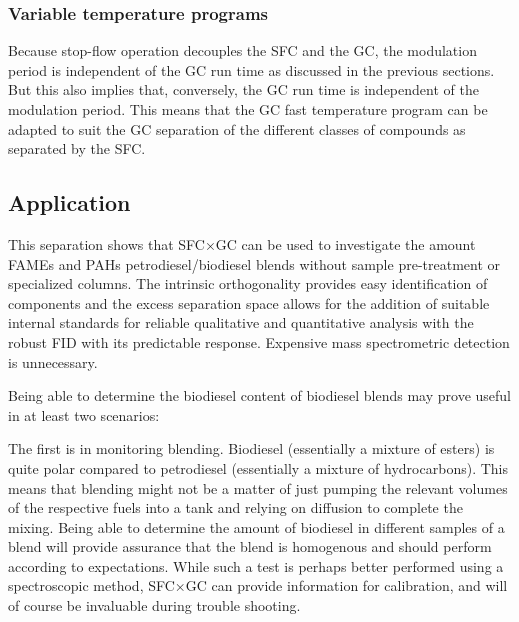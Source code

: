 \subsubsection{Variable temperature programs}

Because stop-flow operation decouples the SFC and the GC, the modulation period
is independent of the GC run time as discussed in the previous sections. But
this also implies that, conversely,  the GC run time is independent of the
modulation period. This means that the GC fast temperature program can be
adapted to suit the GC separation of the different classes of compounds
as separated by the SFC.

\subsection{Application}

This separation shows that SFC×GC can be used to investigate the amount FAMEs and PAHs
petrodiesel/biodiesel blends without sample pre-treatment or
specialized columns. The intrinsic orthogonality provides easy identification of
components and the excess separation space allows for the addition of suitable
internal standards for reliable qualitative and quantitative analysis with the
robust FID with its predictable response. Expensive mass spectrometric detection
is unnecessary.

Being able to determine the biodiesel content of biodiesel blends may prove
useful in at least two scenarios: 

The first is in monitoring blending. Biodiesel (essentially a mixture of esters)
is quite polar compared to petrodiesel (essentially a mixture of hydrocarbons).
This means that blending might not be a matter of just pumping the relevant volumes
of the respective fuels into a tank and relying on diffusion to complete the
mixing. Being able to determine the amount of biodiesel in different samples of
a blend will provide assurance that the blend is homogenous and should perform
according to expectations. While such a test is perhaps better performed using a
spectroscopic method, SFC×GC can provide information for calibration, and will
of course be invaluable during trouble shooting.  

